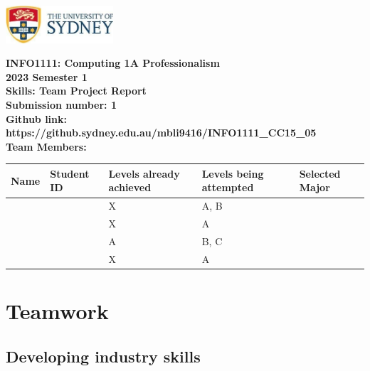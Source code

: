 \documentclass[a4paper, 11pt]{report}
\begin{document}
\begin{titlepage}
\begin{flushright}
\includegraphics[width=4cm]{USyd}\\[2cm]
\end{flushright}
\center 
\textbf{\huge INFO1111: Computing 1A Professionalism}\\[0.75cm]
\textbf{\huge 2023 Semester 1}\\[2cm]
\textbf{\huge Skills: Team Project Report}\\[3cm]

\textbf{\huge Submission number: 1}\\[0.75cm]
\textbf{Github link: https://github.sydney.edu.au/mbli9416/INFO1111\_CC15\_05}\\[0.75cm]
\textbf{\huge Team Members:}\\[0.75cm]

\begin{tabular}{|p{}|p{}|p{}|p{}|p{}|}
	\hline
	Name & Student ID & \raggedright{Levels already achieved} & \raggedright{Levels being attempted} & Selected Major \\
	\hline
	\hline
	\raggedright{\studA} & \sidA & X & A, B & \majA \\
	\raggedright{\studB} & \sidB & X & A & \majB \\
	\raggedright{\studC} & \sidC & A & B,  C & \majC \\
	\raggedright{\studD} & \sidD & X & A & \majD \\
	\hline
\end{tabular}
\thispagestyle{empty}
\end{titlepage}



\tableofcontents



\newpage
\section{Teamwork}
\label{sect-team}


\subsection{Developing industry skills}
\end{document}
